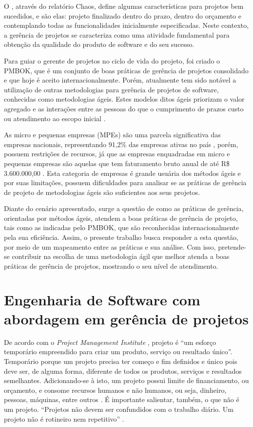 \documentclass[
    12pt,               %
    openright,          %
    twoside,            %
    a4paper,            %
    chapter=TITLE,     %
    english,            %
    spanish,            %
    portuguese              %
    ]{abntex2}
\newcommand\dblquote[1]{\textquotedblleft #1\textquotedblright}
\begin{document}
O , através do relatório Chaos, define algumas características para projetos bem sucedidos, e são elas: projeto finalizado dentro do prazo, dentro do orçamento e contemplando todas as funcionalidades inicialmente especificadas. Neste contexto, a gerência de projetos se caracteriza como uma atividade fundamental para obtenção da qualidade do produto de software e do seu sucesso.

Para guiar o gerente de projetos no ciclo de vida do projeto, foi criado o PMBOK, que é um conjunto de boas práticas de gerência de projetos consolidado e que hoje é aceito internacionalmente. Porém, atualmente tem sido notável a utilização de outras metodologias para gerência de projetos de software, conhecidas como metodologias ágeis. Estes modelos ditos ágeis priorizam o valor agregado e as interações entre as pessoas do que o cumprimento de prazos custo ou atendimento ao escopo inicial \cite[p.~xxi]{prikladnickiAtAll}.

As micro e pequenas empresas (MPEs) são uma parcela significativa das empresas nacionais, representando 91,2\% das empresas ativas no país \cite{ibpt2016}, porém, possuem restrições de recursos, já que as empresas enquadradas em micro e pequenas empresas são aquelas que tem faturamento bruto anual de até R\$ 3.600.000,00 \cite{brasil2006}. Esta categoria de empresas é grande usuária dos métodos ágeis e por suas limitações, possuem dificuldades para analisar se as práticas de gerência de projeto de metodologias ágeis são suficientes aos seus projetos.

Diante do cenário apresentado, surge a questão de como as práticas de gerência, orientadas por métodos ágeis, atendem a boas práticas de gerência de projeto, tais como as indicadas pelo PMBOK, que são reconhecidas internacionalmente pela sua eficiência. Assim, o presente trabalho busca responder a esta questão, por meio de um mapeamento  entre as práticas e sua análise. Com isso, pretende-se contribuir na escolha de uma metodologia ágil que melhor atenda a boas práticas de gerência de projetos, mostrando o seu nível de atendimento.


\chapter{Engenharia de Software com abordagem em gerência de projetos}

De acordo com o \textit{Project Management Institute} \cite{pmi2013}, projeto é \dblquote{um esforço temporário empreendido para criar um produto, serviço ou resultado único}. Temporário porque um projeto precisa ter começo e fim definidos e único pois deve ser, de alguma forma, diferente de todos os produtos, serviços e resultados semelhantes. Adicionando-se à isto, um projeto possui limite de financiamento, ou orçamento, e consome recursos humanos e não humanos, ou seja, dinheiro, pessoas, máquinas, entre outros \cite[p.~2]{kerzner2011}. É importante salientar, também, o que não é um projeto. \dblquote{Projetos não devem ser confundidos com o trabalho diário. Um projeto não é rotineiro nem repetitivo} \cite[p.~6]{grayLarson2009}.
\end{document}
